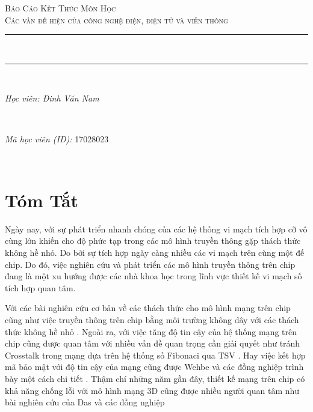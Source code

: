 \documentclass{article}
\date{\today}											%
\begin{document}

\begin{titlepage}
	\centering
	\vspace*{0.5 cm}
	\textsc{\LARGE Báo Cáo Kết Thúc Môn Học}\\[1.0 cm]	%
	\textsc{\Large Các vấn đề hiện  của công nghệ điện, điện tử và viễn thông}\\[0.5 cm]				%
	\rule{\linewidth}{0.2 mm} \\[0.4 cm]
	\rule{\linewidth}{0.2 mm} \\[1.5 cm]
	
	\begin{minipage}{0.5\textwidth}
		\begin{flushleft} \large
			\emph{Học viên: Đinh Văn Nam}\\
		\end{flushleft}
	\end{minipage}~
	\begin{minipage}{0.5\textwidth}
		\begin{flushright} \large
			\emph{Mã học viên (ID):} 17028023									%
		\end{flushright}
	\end{minipage}\\[2 cm]
	\vfill
\end{titlepage}
	
	\tableofcontents
	\pagebreak
	

\section*{Tóm Tắt}
Ngày nay, với sự phát triển nhanh chóng của các hệ thống vi mạch tích hợp cỡ vô cùng lớn khiến cho độ phức tạp trong các mô hình truyền thông gặp thách thức không hề nhỏ. Do bởi sự tích hợp ngày càng nhiều các vi mạch trên cùng một đế chip. Do đó, việc nghiên cứu và phát triển các mô hình truyền thông trên chip đang là một xu hướng được các nhà khoa học trong lĩnh vực thiết kế vi mạch số tích hợp quan tâm.

Với các bài nghiên cứu cơ bản về các thách thức cho mô hình mạng trên chip \cite{7208160} cũng như việc truyền thông trên chip bằng môi trường không  dây với các thách thức không hề nhỏ \cite{6197727}. Ngoài ra, với việc tăng độ tin cậy của hệ thống mạng trên chip cũng được quan tâm với nhiều vấn đề quan trọng cần giải quyết như tránh Crosstalk trong mạng dựa trên hệ thống số Fibonaci qua TSV \cite{cui_enhancement_2017}.  Hay việc kết hợp mã bảo mật với độ tin cậy của mạng cũng được Wehbe và các đồng nghiệp trình bày một cách chi tiết \cite{wehbe_secure_2016}. Thậm chí những năm gần đây, thiết kế mạng trên chip có khả năng chống lỗi với mô hình mạng 3D cũng được nhiều người quan tâm như bài nghiên cứu của Das và các đồng nghiệp \cite{das_robust_2017}
\end{document}
